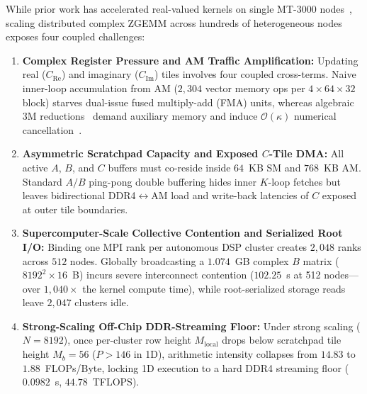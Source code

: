\documentclass[conference]{IEEEtran}
\begin{document}
While prior work has accelerated real-valued kernels on single MT-3000 nodes~\cite{fang2026mtgemm, mo2024irregular, qi2025constraint, qi2026attention}, scaling distributed complex ZGEMM across hundreds of heterogeneous nodes exposes four coupled challenges:
\begin{enumerate}\setlength{\itemsep}{0.5pt}\setlength{\parskip}{0pt}
    \item \textbf{Complex Register Pressure and AM Traffic Amplification:} Updating real ($C_{\mathrm{Re}}$) and imaginary ($C_{\mathrm{Im}}$) tiles involves four coupled cross-terms. Naive inner-loop accumulation from AM ($2{,}304$ vector memory ops per $4 \times 64 \times 32$ block) starves dual-issue fused multiply-add (FMA) units, whereas algebraic 3M reductions~\cite{vanzee2017complex} demand auxiliary memory and induce $\mathcal{O}(\kappa)$ numerical cancellation~\cite{higham2002accuracy}.
    \item \textbf{Asymmetric Scratchpad Capacity and Exposed $C$-Tile DMA:} All active $A$, $B$, and $C$ buffers must co-reside inside $64$~KB SM and $768$~KB AM. Standard $A/B$ ping-pong double buffering hides inner $K$-loop fetches but leaves bidirectional DDR4$\leftrightarrow$AM load and write-back latencies of $C$ exposed at outer tile boundaries.
    \item \textbf{Supercomputer-Scale Collective Contention and Serialized Root I/O:} Binding one MPI rank per autonomous DSP cluster creates $2{,}048$ ranks across $512$ nodes. Globally broadcasting a $1.074$~GB complex $B$ matrix ($8192^2 \times 16$~B) incurs severe interconnect contention ($102.25$~s at 512 nodes---over $1{,}040\times$ the kernel compute time), while root-serialized storage reads leave $2{,}047$ clusters idle.
    \item \textbf{Strong-Scaling Off-Chip DDR-Streaming Floor:} Under strong scaling ($N=8192$), once per-cluster row height $M_{\mathrm{local}}$ drops below scratchpad tile height $M_b = 56$ ($P > 146$ in 1D), arithmetic intensity collapses from $14.83$ to $1.88$~FLOPs/Byte, locking 1D execution to a hard DDR4 streaming floor ($0.0982$~s, $44.78$~TFLOPS).
\end{enumerate}
\end{document}
